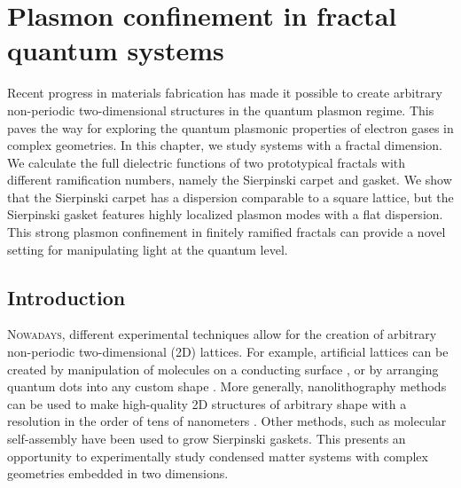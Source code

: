 \openleft%
\chapter{Plasmon confinement in fractal quantum systems}\label{ch:prb18}

{\small Recent progress in materials fabrication has made it possible to create arbitrary non-periodic two-dimensional structures in the quantum plasmon regime. This paves the way for exploring the quantum plasmonic properties of electron gases in complex geometries. In this chapter, we study systems with a fractal dimension.  We calculate the full dielectric functions of two prototypical fractals with different ramification numbers, namely the Sierpinski carpet and gasket. We show that the Sierpinski carpet has a dispersion comparable to a square lattice, but the Sierpinski gasket features highly localized plasmon modes with a flat dispersion. This strong plasmon confinement in finitely ramified fractals can provide a novel setting for manipulating light at the quantum level.}

\clearpage

\section{Introduction}

\lettrine[lines=3]{N}{owadays}, different experimental techniques allow for the creation of arbitrary non-periodic two-dimensional (2D) lattices. For example, artificial lattices can be created by manipulation of molecules on a conducting surface \cite{gomes2012designer, slot2017experimental}, or by arranging quantum dots into any custom shape \cite{engineering2009, artificial2013}.  More generally, nanolithography methods can be used to make high-quality 2D structures of arbitrary shape with a resolution in the order of tens of nanometers \cite{scarabelli2015fabrication}. Other methods, such as molecular self-assembly \cite{newkome2006nanoassembly, assembly2015} have been used to grow Sierpinski gaskets. This presents an opportunity to experimentally study condensed matter systems with complex geometries embedded in two dimensions.

